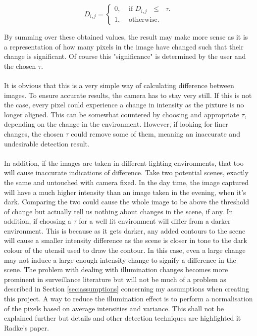 \documentclass[11pt]{article}
\begin{document}
\begin{equation}
	D_{i,j} = 
	\begin{cases}
	0, & \text{ if $D_{i,j}$ $\leq$ $\tau$}. \\
	1, & \text{ otherwise}.
	\end{cases}
	\label{eq:differencingEq}
\end{equation}

By summing over these obtained values, the result may make more
sense as it is a representation of how many pixels in the image have
changed such that their change is significant. Of course this
"significance" is determined by the user and the chosen $\tau$.\\
\\
It is obvious that this is a very simple way of calculating difference
between images. To ensure accurate results, the camera has to stay
very still. If this is not the case, every pixel could experience a 
change in intensity as the pixture is no longer aligned. 
This can be somewhat countered by choosing
and appropriate $\tau$, depending on the change in the environment. 
However, if looking for finer changes, the
chosen $\tau$ could remove some of them, meaning an inaccurate and
undesirable detection result.\\
\\
In addition, if the images are taken in different lighting environments,
that too will cause inaccurate indications of difference. Take two
potential scenes, exactly the same and untouched with camera fixed. In
the day time, the image captured will have a much higher intensity
than an image taken in the evening, when it's dark. 
Comparing the two could cause the whole image
to be above the threshold of change but actually tell us nothing 
about changes in the scene, if any. In addition, if choosing a $\tau$ for 
a well lit environment will differ from a darker environment. This is because
as it gets darker, any added contours to the scene will cause a smaller
intensity difference as the scene is closer in tone to the dark colour
of the utensil used to draw the contour. In this case, even a large change
may not induce a large enough intensity change to signify a difference in the
scene. The problem with dealing with
illumination changes becomes more prominent in surveillance literature but
will not be much of a problem as described in Section \ref{sec:assumptions}
concerning my assumptions when creating this project.
A way to reduce the illumination effect is to perform a normalisation
of the pixels based on average intensities and variance. This shall
not be explained further but details and other detection 
techniques are highlighted it Radke's paper\cite{Radke04}.
\end{document}
